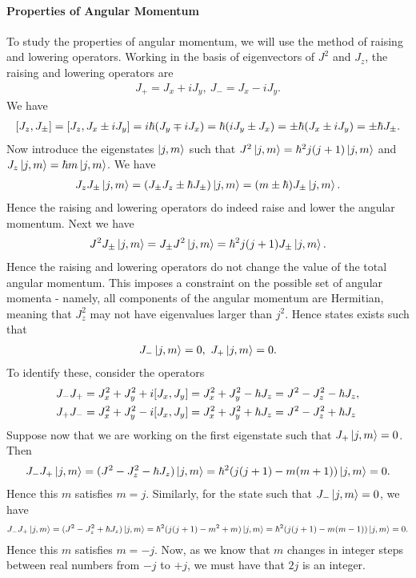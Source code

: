 \paragraph{Properties of Angular Momentum}
To study the properties of angular momentum, we will use the method of raising and lowering operators. Working in the basis of eigenvectors of $J^{2}$ and $J_{z}$, the raising and lowering operators are
\begin{align*}
	J_{+} = J_{x} + iJ_{y},\ J_{-} = J_{x} - iJ_{y}.
\end{align*}
We have
\begin{align*}
	\comm{J_{z}}{J_{\pm}} = \comm{J_{z}}{J_{x} \pm iJ_{y}} = i\hbar(J_{y} \mp iJ_{x}) = \hbar(iJ_{y} \pm J_{x}) = \pm\hbar(J_{x} \pm iJ_{y}) = \pm\hbar J_{\pm}.
\end{align*}
Now introduce the eigenstates $\ket{j, m}$ such that $J^{2}\ket{j, m} = \hbar^{2}j(j + 1)\ket{j, m}$ and $J_{z}\ket{j, m} = \hbar m\ket{j, m}$. We have
\begin{align*}
	J_{z}J_{\pm}\ket{j, m} = (J_{\pm}J_{z} \pm \hbar J_{\pm})\ket{j, m} = (m \pm \hbar)J_{\pm}\ket{j, m}.
\end{align*}
Hence the raising and lowering operators do indeed raise and lower the angular momentum. Next we have
\begin{align*}
J^{2}J_{\pm}\ket{j, m} = J_{\pm}J^{2}\ket{j, m} = \hbar^{2}j(j + 1)J_{\pm}\ket{j, m}.
\end{align*}
Hence the raising and lowering operators do not change the value of the total angular momentum. This imposes a constraint on the possible set of angular momenta - namely, all components of the angular momentum are Hermitian, meaning that $J_{z}^{2}$ may not have eigenvalues larger than $j^{2}$. Hence states exists such that
\begin{align*}
	J_{-}\ket{j, m} = 0,\ J_{+}\ket{j, m} = 0.
\end{align*}
To identify these, consider the operators
\begin{align*}
	J_{-}J_{+} &= J_{x}^{2} + J_{y}^{2} + i\comm{J_{x}}{J_{y}} = J_{x}^{2} + J_{y}^{2} - \hbar J_{z} = J^{2} - J_{z}^{2} - \hbar J_{z}, \\
	J_{+}J_{-} &= J_{x}^{2} + J_{y}^{2} - i\comm{J_{x}}{J_{y}} = J_{x}^{2} + J_{y}^{2} + \hbar J_{z} = J^{2} - J_{z}^{2} + \hbar J_{z}
\end{align*}
Suppose now that we are working on the first eigenstate such that $J_{+}\ket{j, m} = 0$. Then
\begin{align*}
	J_{-}J_{+}\ket{j, m} = (J^{2} - J_{z}^{2} - \hbar J_{z})\ket{j, m} = \hbar^{2}(j(j + 1) - m(m + 1))\ket{j, m} = 0.
\end{align*}
Hence this $m$ satisfies $m = j$. Similarly, for the state such that $J_{-}\ket{j, m} = 0$, we have
\begin{align*}
	J_{-}J_{+}\ket{j, m} = (J^{2} - J_{z}^{2} + \hbar J_{z})\ket{j, m} = \hbar^{2}(j(j + 1) - m^{2} + m)\ket{j, m} = \hbar^{2}(j(j + 1) - m(m - 1))\ket{j, m} = 0.
\end{align*}
Hence this $m$ satisfies $m = -j$. Now, as we know that $m$ changes in integer steps between real numbers from $-j$ to $+j$, we must have that $2j$ is an integer.

